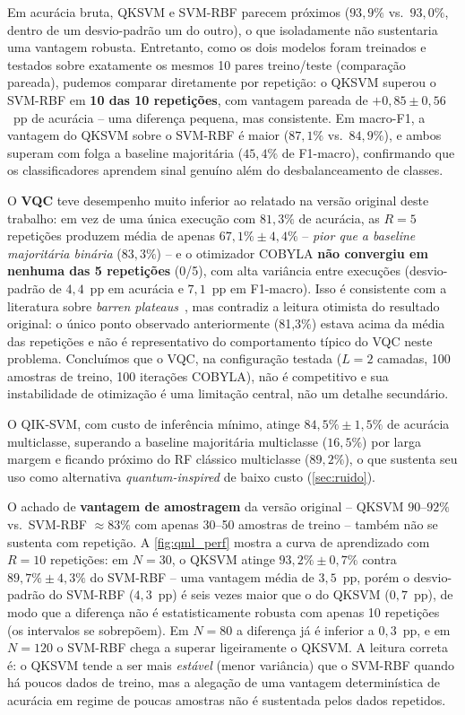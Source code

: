 \documentclass[12pt]{article}
\begin{document}
Em acurácia bruta, QKSVM e SVM-RBF parecem próximos ($93{,}9\%$ vs.\ $93{,}0\%$, dentro de um desvio-padrão um do outro), o que isoladamente não sustentaria uma vantagem robusta. Entretanto, como os dois modelos foram treinados e testados sobre exatamente os mesmos 10 pares treino/teste (comparação pareada), pudemos comparar diretamente por repetição: o QKSVM superou o SVM-RBF em \textbf{10 das 10 repetições}, com vantagem pareada de $+0{,}85 \pm 0{,}56$~pp de acurácia -- uma diferença pequena, mas consistente. Em macro-F1, a vantagem do QKSVM sobre o SVM-RBF é maior ($87{,}1\%$ vs.\ $84{,}9\%$), e ambos superam com folga a baseline majoritária ($45{,}4\%$ de F1-macro), confirmando que os classificadores aprendem sinal genuíno além do desbalanceamento de classes.

O \textbf{VQC} teve desempenho muito inferior ao relatado na versão original deste trabalho: em vez de uma única execução com $81{,}3\%$ de acurácia, as $R=5$ repetições produzem média de apenas $67{,}1\% \pm 4{,}4\%$ -- \emph{pior que a baseline majoritária binária} ($83{,}3\%$) -- e o otimizador COBYLA \textbf{não convergiu em nenhuma das 5 repetições} (0/5), com alta variância entre execuções (desvio-padrão de $4{,}4$~pp em acurácia e $7{,}1$~pp em F1-macro). Isso é consistente com a literatura sobre \textit{barren plateaus}~\cite{cerezo2021}, mas contradiz a leitura otimista do resultado original: o único ponto observado anteriormente (81,3\%) estava acima da média das repetições e não é representativo do comportamento típico do VQC neste problema. Concluímos que o VQC, na configuração testada ($L=2$ camadas, 100 amostras de treino, 100 iterações COBYLA), não é competitivo e sua instabilidade de otimização é uma limitação central, não um detalhe secundário.

O QIK-SVM, com custo de inferência mínimo, atinge $84{,}5\% \pm 1{,}5\%$ de acurácia multiclasse, superando a baseline majoritária multiclasse ($16{,}5\%$) por larga margem e ficando próximo do RF clássico multiclasse ($89{,}2\%$), o que sustenta seu uso como alternativa \textit{quantum-inspired} de baixo custo (\autoref{sec:ruido}).

O achado de \textbf{vantagem de amostragem} da versão original -- QKSVM $90$--$92\%$ vs.\ SVM-RBF $\approx\!83\%$ com apenas 30--50 amostras de treino -- também não se sustenta com repetição. A \autoref{fig:qml_perf} mostra a curva de aprendizado com $R=10$ repetições: em $N=30$, o QKSVM atinge $93{,}2\% \pm 0{,}7\%$ contra $89{,}7\% \pm 4{,}3\%$ do SVM-RBF -- uma vantagem média de $3{,}5$~pp, porém o desvio-padrão do SVM-RBF ($4{,}3$~pp) é seis vezes maior que o do QKSVM ($0{,}7$~pp), de modo que a diferença não é estatisticamente robusta com apenas 10 repetições (os intervalos se sobrepõem). Em $N=80$ a diferença já é inferior a $0{,}3$~pp, e em $N=120$ o SVM-RBF chega a superar ligeiramente o QKSVM. A leitura correta é: o QKSVM tende a ser mais \emph{estável} (menor variância) que o SVM-RBF quando há poucos dados de treino, mas a alegação de uma vantagem determinística de acurácia em regime de poucas amostras não é sustentada pelos dados repetidos.
\end{document}
